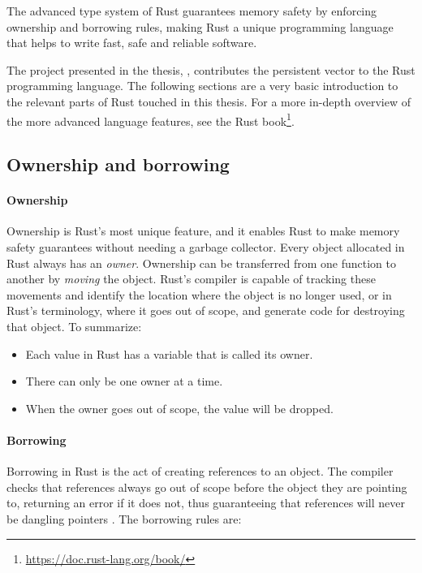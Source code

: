 The advanced type system of Rust guarantees memory safety by enforcing ownership and borrowing rules, making Rust a unique programming language that helps to write fast, safe and reliable software.

The project presented in the thesis, \pvecrs{}, contributes the persistent vector to the Rust programming language. The following sections are a very basic introduction to the relevant parts of Rust touched in this thesis. For a more in-depth overview of the more advanced language features, see the Rust book\footnote{\url{https://doc.rust-lang.org/book/}}.

\subsection{Ownership and borrowing}

\paragraph{Ownership}
Ownership is Rust's most unique feature, and it enables Rust to make memory safety guarantees without needing a garbage collector. Every object allocated in Rust always has an \emph{owner}. Ownership can be transferred from one function to another by \emph{moving} the object. Rust's compiler is capable of tracking these movements and identify the location where the object is no longer used, or in Rust's terminology, where it goes out of scope, and generate code for destroying that object. To summarize:

\begin{itemize}
    \item Each value in Rust has a variable that is called its owner.
    \item There can only be one owner at a time.
    \item When the owner goes out of scope, the value will be dropped.
\end{itemize}

\paragraph{Borrowing}
Borrowing in Rust is the act of creating references to an object. The compiler checks that references always go out of scope before the object they are pointing to, returning an error if it does not, thus guaranteeing that references will never be dangling pointers \cite{reed-patina}. The borrowing rules are:

